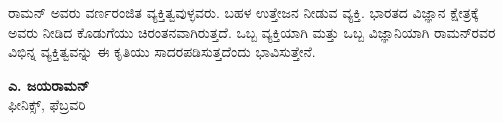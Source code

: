 ರಾಮನ್ ಅವರು ವರ್ಣರಂಜಿತ ವ್ಯಕ್ತಿತ್ವವುಳ್ಳವರು. ಬಹಳ ಉತ್ತೇಜನ ನೀಡುವ ವ್ಯಕ್ತಿ. ಭಾರತದ ವಿಜ್ಞಾನ ಕ್ಷೇತ್ರಕ್ಕೆ ಅವರು ನೀಡಿದ ಕೊಡುಗೆಯು ಚಿರಂತನವಾಗಿರುತ್ತದೆ. ಒಬ್ಬ ವ್ಯಕ್ತಿಯಾಗಿ ಮತ್ತು ಒಬ್ಬ ವಿಜ್ಞಾನಿಯಾಗಿ ರಾಮನ್‍ರವರ ವಿಭಿನ್ನ ವ್ಯಕ್ತಿತ್ವವನ್ನು ಈ ಕೃತಿಯು ಸಾದರಪಡಿಸುತ್ತದೆಂದು ಭಾವಿಸುತ್ತೇನೆ.

\begin{flushright}
\textbf{ಎ. ಜಯರಾಮನ್}\\ಫೀನಿಕ್ಸ್, ಫೆಬ್ರವರಿ 
\end{flushright}

